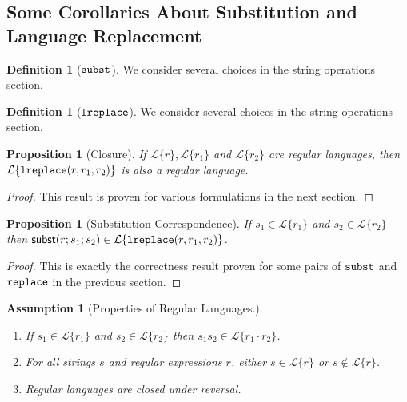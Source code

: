 \documentclass[11pt,leqno]{article}
\newtheorem{ass}[tr]{Assumption}
\newtheorem{prop}[thm]{Proposition}
\theoremstyle{definition}
\newtheorem{defn}[thm]{Definition}
\newcommand{\Lagr}{\mathcal{L}}
\newcommand{\lang}[1]{\Lagr\{#1\}}
\newcommand{\lsubst}[3]{{\sf subst}(#1;#2;#3)} %
\newcommand{\lreplace}[3]{{\sf lreplace}(#1; #2; #3)}
\renewcommand{\lreplace}[3]{{\tt lreplace}(#1, #2, #3)}
\begin{document}

\subsection{Some Corollaries About Substitution and Language Replacement}

\begin{defn}[$\tt{subst}$]
We consider several choices in the string operations section.
\end{defn}

\begin{defn}[$\tt{lreplace}$]
We consider several choices in the string operations section.
\end{defn}

\begin{prop}[Closure] \label{thm:total}
  If $\lang{r}, \lang{r_1}$ and $\lang{r_2}$ are regular languages, then $\lang{\lreplace{r}{r_1}{r_2}}$ is also a regular language.
\end{prop}
\begin{proof}
This result is proven for various formulations in the next section.
\end{proof}

\begin{prop}[Substitution Correspondence] \label{thm:substcorrespondence}
  If $s_1 \in \lang{r_1}$ and $s_2 \in \lang{r_2}$ then $\lsubst{r}{s_1}{s_2} \in \lang{\lreplace{r}{r_1}{r_2}}$.
\end{prop}
\begin{proof}
This is exactly the correctness result proven for some pairs of ${\tt subst}$ and ${\tt replace}$ in the previous section.
\end{proof}

\begin{ass}[Properties of Regular Languages.] \label{thm:regexprops}
~
\begin{enumerate}

\item If $s_1 \in \lang{r_1}$ and $s_2 \in \lang{r_2}$ then $s_1s_2 \in \lang{r_1\cdot r_2}$.
\item For all strings $s$ and regular expressions $r$, either $s \in \lang{r}$ or $s \not \in \lang{r}$.
\item Regular languages are closed under reversal.
\end{enumerate}
\end{ass}
\end{document}

